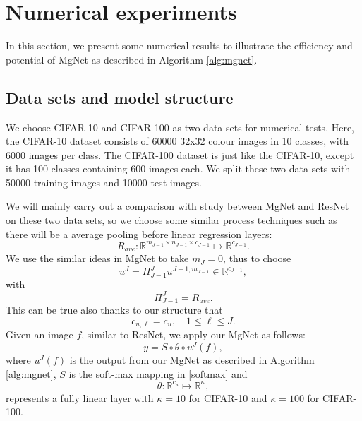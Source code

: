 \section{Numerical experiments}\label{sec:numerics}
In this section, we present some numerical results to illustrate the
efficiency and potential of MgNet as described in Algorithm
\ref{alg:mgnet}.

\subsection{Data sets and model structure }
We choose CIFAR-10 and CIFAR-100 
\cite{krizhevsky2009learning}
as two data sets for numerical tests. 
Here, the CIFAR-10 dataset consists of 60000 32x32 colour 
images in 10 classes, with 6000 images per class. 
The CIFAR-100 dataset is just like the CIFAR-10, 
except it has 100 classes containing 600 images each. 
We split these two data sets with 50000 training images 
and 10000 test images. 


We will mainly carry out
 a comparison with study between MgNet and  ResNet \cite{he2016deep} 
on these two data sets, so we choose some 
similar process techniques such as there will 
be a average pooling before linear regression
layers:
\begin{equation}\label{eq:ave-pooling}
R_{ave}: \mathbb{R}^{m_{J-1} \times n_{J-1} \times c_{J-1}} \mapsto \mathbb{R}^{c_{J-1}}.
\end{equation}
We use the similar ideas in MgNet to take $m_{J} = 0$, thus to choose 
$$
u^{J} = \Pi_{J-1}^J u^{J-1, m_{J-1}} \in \mathbb{R}^{c_{J-1}},
$$
with
$$
\Pi_{J-1}^J  = R_{ave}.
$$
This can be true also thanks to our structure that 
\begin{equation}\label{eq:c_u}
c_{u,\ell} = c_{u}, \quad 1 \le \ell \le J.
\end{equation}
Given an image $f$, similar to ResNet, we apply our MgNet as follows:
\begin{equation}\label{final-mg}
y = S \circ \theta \circ u^{J}(f),
\end{equation}
where $u^J(f)$ is the output from our MgNet as described in Algorithm
\ref{alg:mgnet},  $S$ is the soft-max mapping in \eqref{softmax} and 
\begin{equation}\label{final-theta}
\theta: \mathbb{R}^{c_u} \mapsto \mathbb{R}^\kappa,
\end{equation}
represents a fully linear layer with $\kappa = 10$ for CIFAR-10 and 
$\kappa = 100$ for CIFAR-100.

